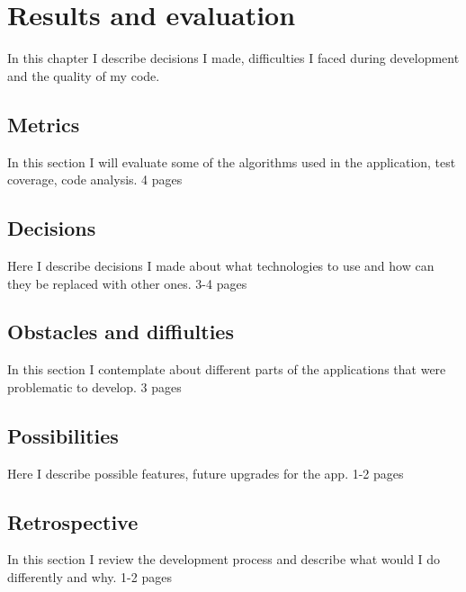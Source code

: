 \chapter{Results and evaluation}\label{ch:elemzes}
\begin{summary}
	In this chapter I describe decisions I made, difficulties I faced during development and the quality of my code.
\end{summary}


\section{Metrics}
In this section I will evaluate some of the algorithms used in the application, test coverage, code analysis. 4 pages

\section{Decisions}
Here I describe decisions I made about what technologies to use and how can they be replaced with other ones. 3-4 pages

\section{Obstacles and diffiulties}
In this section I contemplate about different parts of the applications that were problematic to develop. 3 pages

\section{Possibilities}
Here I describe possible features, future upgrades for the app. 1-2 pages

\section{Retrospective}
In this section I review the development process and describe what would I do differently and why. 1-2 pages
